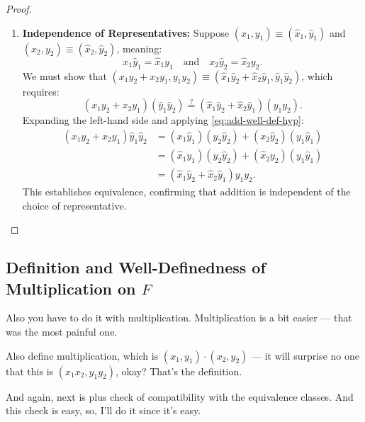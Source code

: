 \begin{content}
\begin{proof}
\begin{enumerate}[label=\textbf{(\arabic*)}]
    \item \textbf{Independence of Representatives:} Suppose $(x_1, y_1) \equiv (\hat{x}_1, \hat{y}_1)$ and $(x_2, y_2) \equiv (\hat{x}_2, \hat{y}_2)$, meaning:
    \begin{equation}\label{eq:add-well-def-hyp}
    x_1 \hat{y}_1 = \hat{x}_1 y_1 \quad \text{and} \quad x_2 \hat{y}_2 = \hat{x}_2 y_2.
    \end{equation}
    We must show that $(x_1 y_2 + x_2 y_1, y_1 y_2) \equiv (\hat{x}_1 \hat{y}_2 + \hat{x}_2 \hat{y}_1, \hat{y}_1 \hat{y}_2)$, which requires:
    \[
    (x_1 y_2 + x_2 y_1)(\hat{y}_1 \hat{y}_2) \overset{?}{=} (\hat{x}_1 \hat{y}_2 + \hat{x}_2 \hat{y}_1)(y_1 y_2).
    \]
    Expanding the left-hand side and applying \eqref{eq:add-well-def-hyp}:
    \begin{align*}
    (x_1 y_2 + x_2 y_1)\hat{y}_1 \hat{y}_2 &= (x_1 \hat{y}_1)(y_2 \hat{y}_2) + (x_2 \hat{y}_2)(y_1 \hat{y}_1) \\
    &= (\hat{x}_1 y_1)(y_2 \hat{y}_2) + (\hat{x}_2 y_2)(y_1 \hat{y}_1) \\
    &= (\hat{x}_1 \hat{y}_2 + \hat{x}_2 \hat{y}_1)y_1 y_2.
    \end{align*}
    This establishes equivalence, confirming that addition is independent of the choice of representative.
\end{enumerate}
\end{proof}
\end{content}

\subsection{Definition and Well-Definedness of Multiplication on \texorpdfstring{$F$}{F}}

\begin{speech}[01:02:25 - 01:03:40]
Also you have to do it with multiplication.  Multiplication is a bit easier --- that was the most painful one.

Also define multiplication,  which is $(x_1, y_1) \cdot (x_2, y_2)$  --- it will surprise no one that this is $(x_1 x_2, y_1 y_2)$, okay?  That's the definition.

And again, next is plus check  of compatibility with the equivalence classes.  And this check is easy, so, I'll do it since it's easy.
\end{speech}

